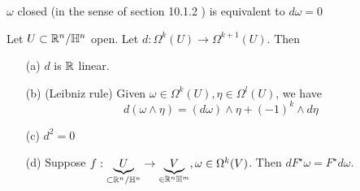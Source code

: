 \begin{remark}
    \(\omega\) closed (in the sense of section 10.1.2 %
    ) is equivalent to \(d\omega=0\)    
\end{remark}


\begin{proposition}\label{prop:10.12}
    Let \(U\subset\mathbb{R}^n/\mathbb{H}^n\) open. Let \(d:\Omega^k(U)\to\Omega^{k+1}(U)\). Then 
    \begin{enumerate}
        \item[(a)] \(d\) is \(\mathbb{R}\) linear.
        \item[(b)] (Leibniz rule) Given \(\omega\in\Omega^k(U),\eta\in \Omega^l(U)\), we have \[d(\omega\wedge \eta)=(d\omega)\wedge \eta+(-1)^k\wedge d\eta\]
        \item[(c)] \(d^2=0\)
        \item[(d)] Suppose \(f:\underbrace{U}_{\subset\mathbb{R}^n/\mathbb{H}^n}\to \underbrace{V}_{\in\mathbb{R}^n\mathbb{H}^m},\omega\in\Omega^k(V)\).
                    Then \(dF^\star \omega=F^\star d\omega\).     
    \end{enumerate}
\end{proposition}

